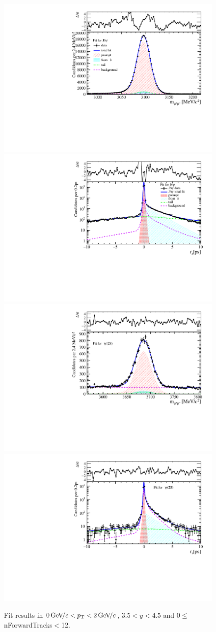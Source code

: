 \begin{figure}[H]
\begin{center}
\includegraphics[width=0.47\linewidth]{pdf/Jpsi/drawmassF/n1y3pt1.pdf}
\includegraphics[width=0.47\linewidth]{pdf/Jpsi/2DFitF/n1y3pt1.pdf}
\vspace*{-0.5cm}
\includegraphics[width=0.47\linewidth]{pdf/Psi2S/drawmassF/n1y3pt1.pdf}
\includegraphics[width=0.47\linewidth]{pdf/Psi2S/2DFitF/n1y3pt1.pdf}
\vspace*{-0.5cm}
\end{center}
\caption{Fit results in $0\text{\,Ge\kern -0.1em V\!/}c<p_{\mathrm{T}}<2\text{\,Ge\kern -0.1em V\!/}c$, $3.5<y<4.5$ and 0$\leq$nForwardTracks$<$12.}
\label{Fitn1y3pt1}
\end{figure}
